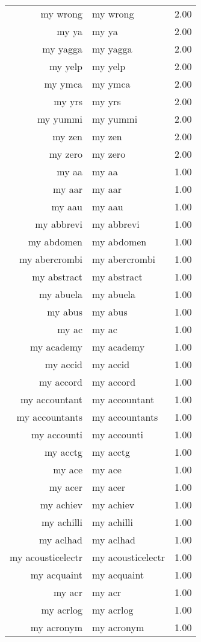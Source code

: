 \begin{table}[ht]
\begin{tabular}{rlr}
  my wrong & my wrong & 2.00 \\ 
  my ya & my ya & 2.00 \\ 
  my yagga & my yagga & 2.00 \\ 
  my yelp & my yelp & 2.00 \\ 
  my ymca & my ymca & 2.00 \\ 
  my yrs & my yrs & 2.00 \\ 
  my yummi & my yummi & 2.00 \\ 
  my zen & my zen & 2.00 \\ 
  my zero & my zero & 2.00 \\ 
  my aa & my aa & 1.00 \\ 
  my aar & my aar & 1.00 \\ 
  my aau & my aau & 1.00 \\ 
  my abbrevi & my abbrevi & 1.00 \\ 
  my abdomen & my abdomen & 1.00 \\ 
  my abercrombi & my abercrombi & 1.00 \\ 
  my abstract & my abstract & 1.00 \\ 
  my abuela & my abuela & 1.00 \\ 
  my abus & my abus & 1.00 \\ 
  my ac & my ac & 1.00 \\ 
  my academy & my academy & 1.00 \\ 
  my accid & my accid & 1.00 \\ 
  my accord & my accord & 1.00 \\ 
  my accountant & my accountant & 1.00 \\ 
  my accountants & my accountants & 1.00 \\ 
  my accounti & my accounti & 1.00 \\ 
  my acctg & my acctg & 1.00 \\ 
  my ace & my ace & 1.00 \\ 
  my acer & my acer & 1.00 \\ 
  my achiev & my achiev & 1.00 \\ 
  my achilli & my achilli & 1.00 \\ 
  my aclhad & my aclhad & 1.00 \\ 
  my acousticelectr & my acousticelectr & 1.00 \\ 
  my acquaint & my acquaint & 1.00 \\ 
  my acr & my acr & 1.00 \\ 
  my acrlog & my acrlog & 1.00 \\ 
  my acronym & my acronym & 1.00 \\ 

\end{tabular}
\end{table}
